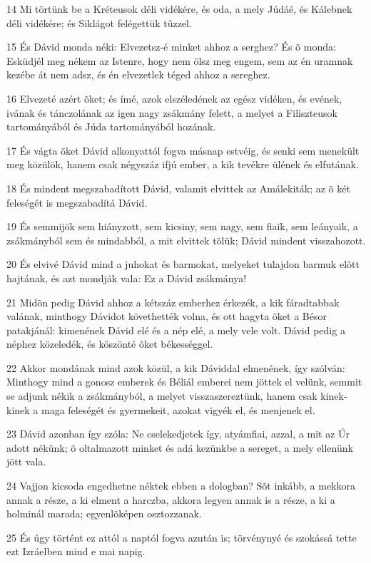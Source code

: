 \par 14 Mi törtünk be a Kréteusok déli vidékére, és oda, a mely Júdáé, és Kálebnek  déli vidékére; és Siklágot felégettük tûzzel.
\par 15 És Dávid monda néki: Elvezetsz-é minket ahhoz a serghez? És õ monda: Esküdjél meg nékem az Istenre, hogy nem ölsz meg engem, sem az én uramnak kezébe át nem adsz, és én elvezetlek téged ahhoz a sereghez.
\par 16 Elvezeté azért õket; és ímé, azok elszéledének az egész vidéken, és evének, ivának és tánczolának az igen nagy zsákmány felett, a melyet a Filiszteusok tartományából és Júda tartományából hozának.
\par 17 És vágta õket Dávid alkonyattól fogva másnap estvéig, és senki sem menekült meg közülök, hanem csak négyszáz ifjú ember, a kik tevékre ülének és elfutának.
\par 18 És mindent megszabadított Dávid, valamit elvittek az Amálekiták; az õ két feleségét is megszabadítá Dávid.
\par 19 És semmijök sem hiányzott, sem kicsiny, sem nagy, sem fiaik, sem leányaik, a zsákmányból sem és mindabból, a mit elvittek tõlük; Dávid mindent visszahozott.
\par 20 És elvivé Dávid mind a juhokat és barmokat, melyeket tulajdon barmuk elõtt hajtának, és azt mondják vala: Ez a Dávid zsákmánya!
\par 21 Midõn pedig Dávid ahhoz a kétszáz emberhez érkezék, a kik fáradtabbak valának, minthogy Dávidot követhették volna, és ott hagyta õket a Bésor patakjánál: kimenének Dávid elé és a nép elé, a mely vele volt. Dávid pedig a néphez közeledék, és köszönté õket békességgel.
\par 22 Akkor mondának mind azok közül, a kik Dáviddal elmenének, így szólván: Minthogy mind a gonosz emberek és Béliál emberei nem jöttek el velünk, semmit se adjunk nékik a zsákmányból, a melyet visszaszereztünk, hanem csak kinek-kinek a maga feleségét és gyermekeit, azokat vigyék el, és menjenek el.
\par 23 Dávid azonban így szóla: Ne cselekedjetek így, atyámfiai, azzal, a mit az Úr adott nékünk; õ oltalmazott minket és adá kezünkbe a sereget, a mely ellenünk jött vala.
\par 24 Vajjon kicsoda engedhetne néktek ebben a dologban? Sõt inkább, a mekkora annak a része, a ki elment a harczba, akkora legyen annak is a része, a ki a holminál marada; egyenlõképen osztozzanak.
\par 25 És úgy történt ez attól a naptól fogva azután is; törvénynyé és szokássá tette ezt Izráelben mind e mai napig.
